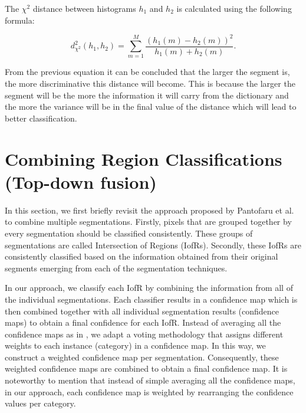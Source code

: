 \documentclass[10pt,twocolumn,letterpaper]{article}
\begin{document}
The $\chi^2$ distance between histograms $h_1$ and $h_2$ is calculated using
the following formula:

\begin{equation}
d^2_{\chi^2}(h_1,h_2) = \sum_{m=1}^M{\frac{(h_1(m) - h_2(m))^2}{h_1(m) + h_2(m)}}.
\end{equation}

From the previous equation it can be concluded that the larger the segment is,
the more discriminative this distance will become. This is because the larger the
segment will be the more the information it will carry from the dictionary and the
more the variance will be in the final value of the distance which will lead
to better classification.

\section{Combining Region Classifications (Top-down fusion)}\label{TopDownComb}

In this section, we first briefly revisit the approach proposed by Pantofaru et al. \cite{PSH08} to combine multiple segmentations.
Firstly, pixels that are grouped together by every segmentation should be classified consistently.
These groups of segmentations are called Intersection of Regions (IofRs).
Secondly, these IofRs are consistently classified based on the information obtained from their original segments emerging from each of the segmentation techniques.

In our approach, we classify each IofR by combining the information from all of the individual segmentations.
Each classifier results in a confidence map which is then combined together with all individual segmentation results (confidence maps) to obtain a final confidence for each IofR.
Instead of averaging all the confidence maps as in \cite{PSH08}, we adapt a voting methodology that assigns different weights to each instance (category) in a confidence map.
In this way, we construct a weighted confidence map per segmentation.
Consequently, these weighted confidence maps are combined to obtain a final confidence map.
It is noteworthy to mention that instead of simple averaging all the confidence maps, in our approach, each confidence map is weighted by rearranging the confidence values per category.
\end{document}
